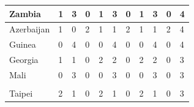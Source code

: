 \documentclass[12pt]{article}  %
\begin{document}
\begin{subappendices}
\begin{longtable}{|l|l|l|l|l|l|l|l|l|l|l|}
	\hline
	Zambia                                                         & 1                                                 & 3                                                 & 0                                                 & 1                                                 & 3                                                 & 0                                                 & 1    & 3      & 0      & 4      \\ 
	\hline
	Azerbaijan                                                     & 1                                                 & 0                                                 & 2                                                 & 1                                                 & 1                                                 & 2                                                 & 1    & 1      & 2      & 4      \\ 
	\hline
	Guinea                                                         & 0                                                 & 4                                                 & 0                                                 & 0                                                 & 4                                                 & 0                                                 & 0    & 4      & 0      & 4      \\ 
	\hline
	Georgia                                                        & 1                                                 & 1                                                 & 0                                                 & 2                                                 & 2                                                 & 0                                                 & 2    & 2      & 0      & 3      \\ 
	\hline
	Mali                                                           & 0                                                 & 3                                                 & 0                                                 & 0                                                 & 3                                                 & 0                                                 & 0    & 3      & 0      & 3      \\ 
	\hline
	\begin{tabular}[c]{@{}l@{}}Chinese\\Taipei\end{tabular}        & 2                                                 & 1                                                 & 0                                                 & 2                                                 & 1                                                 & 0                                                 & 2    & 1      & 0      & 3      \\ 

\end{longtable}
\end{subappendices}
\end{document}
